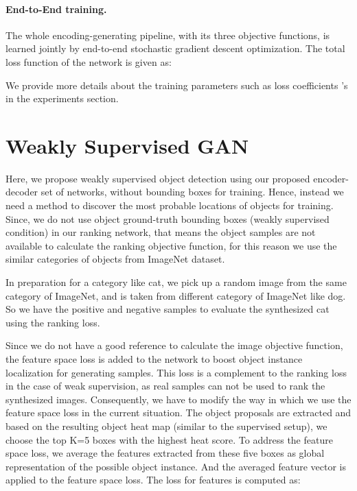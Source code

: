 \documentclass[runningheads]{llncs}
\begin{document}
\paragraph{End-to-End training.}
The whole encoding-generating pipeline, with its three objective functions, is learned jointly by end-to-end stochastic gradient descent optimization. The total loss function of the network is given as:

\noindent We provide more details about the training parameters such as loss coefficients 's in the experiments section. 
 





\section{Weakly Supervised GAN} \label{sec:weakly}

Here, we propose weakly supervised object detection using our proposed encoder-decoder set of networks, without bounding boxes for training. Hence, instead we need a method to discover the most probable locations of objects for training. Since, we do not use object ground-truth bounding boxes (weakly supervised condition) in our ranking network, that means the object samples are not available to calculate the ranking objective function, for this reason we use the similar categories of objects from ImageNet dataset.

In preparation  for a category like cat, we pick up a random image from the same category of ImageNet, and  is taken from different category of ImageNet like dog. So we have the positive and negative samples to evaluate the synthesized cat using the ranking loss.

Since we do not have a good reference to calculate the image objective function, the feature space loss is added to the network to boost object instance localization for generating samples. This loss is a complement to the ranking loss in the case of weak supervision, as real samples can not be used to rank the synthesized images. Consequently, we have to modify the way in which we use the feature space loss in the current situation. The object proposals \cite{SS,edgebox} are extracted and based on the resulting object heat map (similar to the supervised setup), we choose the top K=5 boxes with the highest heat score. To address the feature space loss, we average the features extracted from these five boxes as global representation of the possible object instance. And the averaged feature vector is applied to the feature space loss. The loss for features is computed as:
\end{document}
